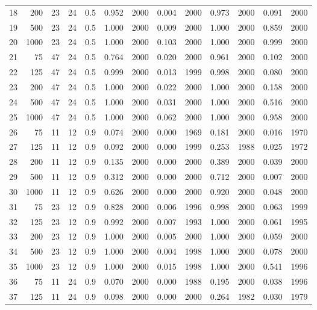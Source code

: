 \documentclass{article}
\begin{document}
\begin{table}[ht]
\begin{center}
\begin{tabular}{rrrrrrrrrrrrr}
  18 & 200 & 23 & 24 & 0.5 & 0.952 & 2000 & 0.004 & 2000 & 0.973 & 2000 & 0.091 & 2000 \\ 
  19 & 500 & 23 & 24 & 0.5 & 1.000 & 2000 & 0.009 & 2000 & 1.000 & 2000 & 0.859 & 2000 \\ 
  20 & 1000 & 23 & 24 & 0.5 & 1.000 & 2000 & 0.103 & 2000 & 1.000 & 2000 & 0.999 & 2000 \\ 
   \hline
21 & 75 & 47 & 24 & 0.5 & 0.764 & 2000 & 0.020 & 2000 & 0.961 & 2000 & 0.102 & 2000 \\ 
  22 & 125 & 47 & 24 & 0.5 & 0.999 & 2000 & 0.013 & 1999 & 0.998 & 2000 & 0.080 & 2000 \\ 
  23 & 200 & 47 & 24 & 0.5 & 1.000 & 2000 & 0.022 & 2000 & 1.000 & 2000 & 0.158 & 2000 \\ 
  24 & 500 & 47 & 24 & 0.5 & 1.000 & 2000 & 0.031 & 2000 & 1.000 & 2000 & 0.516 & 2000 \\ 
  25 & 1000 & 47 & 24 & 0.5 & 1.000 & 2000 & 0.062 & 2000 & 1.000 & 2000 & 0.958 & 2000 \\ 
   \hline
26 & 75 & 11 & 12 & 0.9 & 0.074 & 2000 & 0.000 & 1969 & 0.181 & 2000 & 0.016 & 1970 \\ 
  27 & 125 & 11 & 12 & 0.9 & 0.092 & 2000 & 0.000 & 1999 & 0.253 & 1988 & 0.025 & 1972 \\ 
  28 & 200 & 11 & 12 & 0.9 & 0.135 & 2000 & 0.000 & 2000 & 0.389 & 2000 & 0.039 & 2000 \\ 
  29 & 500 & 11 & 12 & 0.9 & 0.312 & 2000 & 0.000 & 2000 & 0.712 & 2000 & 0.007 & 2000 \\ 
  30 & 1000 & 11 & 12 & 0.9 & 0.626 & 2000 & 0.000 & 2000 & 0.920 & 2000 & 0.048 & 2000 \\ 
   \hline
31 & 75 & 23 & 12 & 0.9 & 0.828 & 2000 & 0.006 & 1996 & 0.998 & 2000 & 0.063 & 1999 \\ 
  32 & 125 & 23 & 12 & 0.9 & 0.992 & 2000 & 0.007 & 1993 & 1.000 & 2000 & 0.061 & 1995 \\ 
  33 & 200 & 23 & 12 & 0.9 & 1.000 & 2000 & 0.005 & 2000 & 1.000 & 2000 & 0.059 & 2000 \\ 
  34 & 500 & 23 & 12 & 0.9 & 1.000 & 2000 & 0.004 & 1998 & 1.000 & 2000 & 0.078 & 2000 \\ 
  35 & 1000 & 23 & 12 & 0.9 & 1.000 & 2000 & 0.015 & 1998 & 1.000 & 2000 & 0.541 & 1996 \\ 
   \hline
36 & 75 & 11 & 24 & 0.9 & 0.070 & 2000 & 0.000 & 1988 & 0.195 & 2000 & 0.038 & 1996 \\ 
  37 & 125 & 11 & 24 & 0.9 & 0.098 & 2000 & 0.000 & 2000 & 0.264 & 1982 & 0.030 & 1979 \\ 

\end{tabular}
\end{center}
\end{table}
\end{document}
